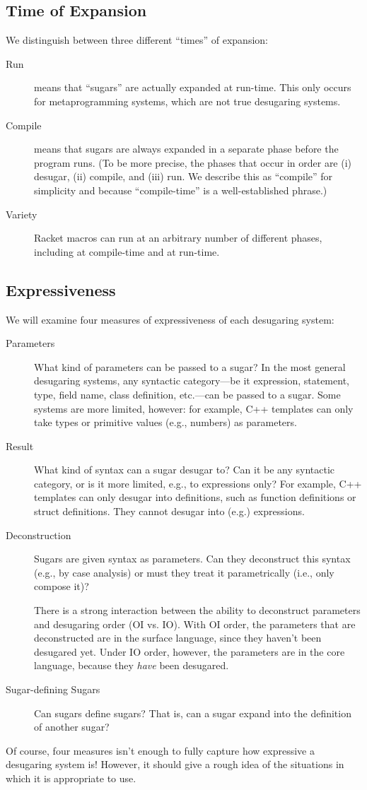 \subsection{Time of Expansion}

We distinguish between three different ``times'' of expansion:
\begin{description}
\item[Run] means that ``sugars'' are actually expanded at run-time.
  This only occurs for metaprogramming systems, which are not true
  desugaring systems.
\item[Compile] means that sugars are always expanded in a separate
  phase before the program runs. (To be more precise, the phases that
  occur in order are (i) desugar, (ii) compile, and (iii) run. We
  describe this as ``compile'' for simplicity and because
  ``compile-time'' is a well-established phrase.)
\item[Variety] Racket macros can run at an arbitrary number of different
  phases, including at compile-time and at run-time.
\end{description}

\subsection{Expressiveness}

We will examine four measures of expressiveness of each desugaring
system:
\begin{description}
\item[Parameters] What kind of parameters can be passed to a sugar? In
  the most general desugaring systems, any syntactic category---be it
  expression, statement, type, field name, class definition,
  etc.---can be passed to a sugar. Some systems are more limited,
  however: for example, C++ templates can only take types or primitive
  values (e.g., numbers) as parameters.
\item[Result] What kind of syntax can a sugar desugar to? Can it be
  any syntactic category, or is it more limited, e.g., to expressions
  only? For example, C++ templates can only desugar into definitions,
  such as function definitions or struct definitions. They cannot
  desugar into (e.g.) expressions.
\item[Deconstruction] Sugars are given syntax as parameters. Can they
  deconstruct this syntax (e.g., by case analysis) or must
  they treat it parametrically (i.e., only compose it)?

  There is a strong interaction between the ability to deconstruct
  parameters and desugaring order (OI vs. IO). With OI order, the
  parameters that are deconstructed are in the surface language, since
  they haven't been desugared yet. Under IO order, however, the
  parameters are in the core language, because they \emph{have} been
  desugared.
\item[Sugar-defining Sugars] Can sugars define sugars? That is, can a
  sugar expand into the definition of another sugar?
\end{description}
Of course, four measures isn't enough to fully capture how expressive
a desugaring system is! However, it should give a rough idea of the
situations in which it is appropriate to use.


